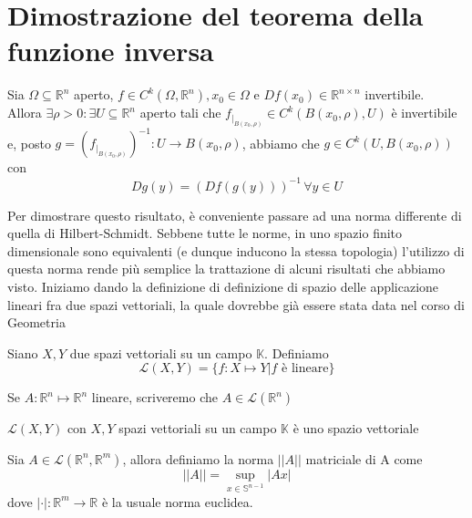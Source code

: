 \chapter{Dimostrazione del teorema della funzione inversa}
\pagestyle{plain}
\thispagestyle{empty}
\pagestyle{fancy}
\begin{theorem}
    Sia $\Omega \subseteq \mathbb{R}^n$ aperto, $f \in C^k(\Omega, \mathbb{R}^n), x_0 \in \Omega$ e $Df(x_0) \in \mathbb{R}^{n \times n}$ invertibile. \\
    Allora $\exists \rho > 0: \exists U \subseteq \mathbb{R}^n$ aperto tali che $f_{|_{B(x_0, \rho)}} \in C^{k}(B(x_0, \rho), U)$ è invertibile e, posto $g=(f_{|_{B(x_0, \rho)}})^{-1}:U \to B(x_0, \rho)$, abbiamo che
    $g \in C^k(U, B(x_0, \rho))$ con
    $$
    Dg(y) = (Df(g(y)))^{-1} \, \forall y \in U
    $$
    \label{thm:inverse_function}
    \end{theorem}
Per dimostrare questo risultato, è conveniente passare ad una norma differente di quella di Hilbert-Schmidt. Sebbene tutte le norme, in uno spazio finito dimensionale sono equivalenti (e dunque inducono la stessa topologia) l'utilizzo di questa norma rende più semplice la trattazione
di alcuni risultati che abbiamo visto. Iniziamo dando la definizione di definizione di spazio delle applicazione lineari fra due spazi vettoriali, la quale dovrebbe già essere stata data nel corso di Geometria
\begin{definition}
    Siano $X, Y$ due spazi vettoriali su un campo $\mathbb{K}$. Definiamo
    $$
    \mathcal{L}(X, Y) = \{f: X \mapsto Y | f \text{ è lineare} \}
    $$
\end{definition}
\begin{remark}
    Se $A : \mathbb{R}^n \mapsto \mathbb{R}^n$ lineare, scriveremo che $A \in \mathcal{L}(\mathbb{R}^n)$
\end{remark}
\begin{remark}
    $\mathcal{L}(X, Y)$ con $X, Y$ spazi vettoriali su un campo $\mathbb{K}$ è uno spazio vettoriale
\end{remark}
\begin{definition}
    Sia $A \in \mathcal{L}(\mathbb{R}^n, \mathbb{R}^m)$, allora definiamo la norma $|| A ||$ matriciale di A come
    \begin{equation}
        || A || = \sup_{x \in \mathbb{S}^{n-1}} |Ax|
    \end{equation}
    dove $|\cdot|:\mathbb{R}^m \to \mathbb{R}$ è la usuale norma euclidea.
\end{definition}

